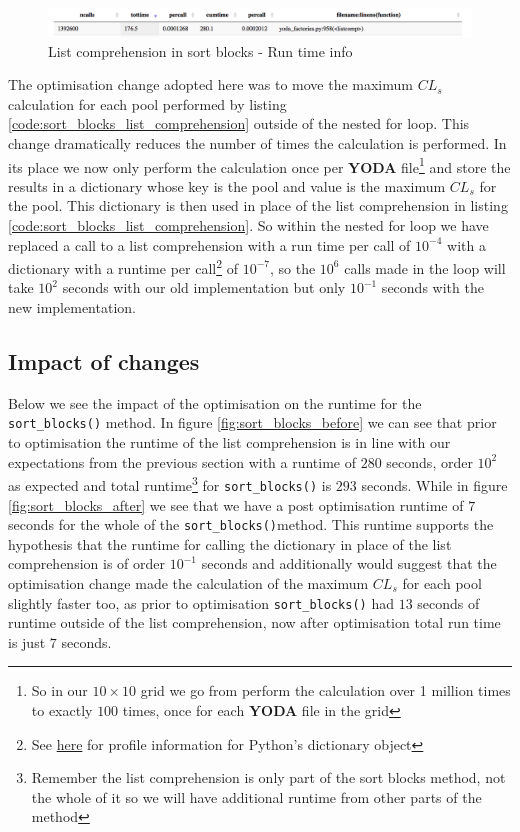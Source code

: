 \begin{figure}[H]
\centering
\includegraphics[scale=0.3]{plots/sort_blocks_list_comprehension.png}
\caption{List comprehension in sort blocks - Run time info}
\label{fig:list_comprehension}
\end{figure}

The optimisation change adopted here was to move the maximum $CL_s$ calculation for each pool performed by listing \ref{code:sort_blocks_list_comprehension} outside of the nested for loop. This change dramatically reduces the number of times the calculation is performed. In its place we now only perform the calculation once per \textbf{YODA} file\footnote{So in our $10\times 10$  grid we go from perform the calculation over 1 million times to exactly $100$ times, once for each \textbf{YODA} file in the grid} and store the results in a dictionary whose key is the pool and value is the maximum $CL_s$ for the pool. This dictionary is then used in place of the list comprehension in  listing \ref{code:sort_blocks_list_comprehension}. So within the nested for loop we have replaced a call to a list comprehension with a run time per call of $10^{-4}$ with a dictionary with a runtime per call\footnote{See \href{https://towardsdatascience.com/faster-lookups-in-python-1d7503e9cd38}{here} for profile information for Python's dictionary object} of $10^{-7}$, so the $10^6$ calls made in the loop will take $10^2$ seconds with our old implementation but only $10^{-1}$ seconds with the new implementation.

\subsection{Impact of changes}

Below we see the impact of the optimisation on the runtime for the \texttt{sort\_blocks()} method. In figure \ref{fig:sort_blocks_before} we can see that prior to optimisation the runtime of the list comprehension is in line with our expectations from the previous section with a runtime of $280$ seconds, order $10^2$ as expected and total runtime\footnote{Remember the list comprehension is only part of the sort blocks method, not the whole of it so we will have additional runtime from other parts of the method} for \texttt{sort\_blocks()} is $293$ seconds. While in figure \ref{fig:sort_blocks_after} we see that we have a post optimisation runtime of $7$ seconds for the whole of the \texttt{sort\_blocks()}method. This runtime supports the hypothesis that the runtime for calling the dictionary in place of the list comprehension is of order $10^{-1}$ seconds and additionally would suggest that the optimisation change made the calculation of the maximum $CL_s$  for each pool slightly faster too, as prior to optimisation \texttt{sort\_blocks()} had $13$ seconds of runtime outside of the list comprehension, now after optimisation total run time is just $7$ seconds. 

